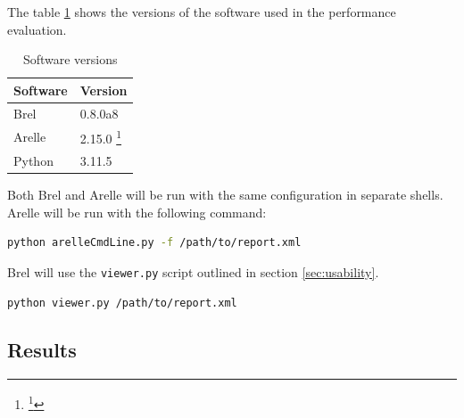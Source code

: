 
The table \ref{tab:software-versions} shows the versions of the software used in the performance evaluation.

\begin{table}[H]
    \centering
    \begin{tabular}{|l|l|}
        \hline
        \textbf{Software} & \textbf{Version} \\
        \hline
        Brel & 0.8.0a8 \\
        Arelle & 2.15.0 \footnote{\footnote{\url{https://github.com/Arelle/Arelle/releases/tag/2.15.0}}} \\
        Python & 3.11.5 \\
        \hline
    \end{tabular}
    \caption{Software versions}
    \label{tab:software-versions}
\end{table}

Both Brel and Arelle will be run with the same configuration in separate shells.
Arelle will be run with the following command:

\begin{lstlisting}[language=bash, basicstyle=\ttfamily\small]
python arelleCmdLine.py -f /path/to/report.xml
\end{lstlisting}

Brel will use the \texttt{viewer.py} script outlined in section \ref{sec:usability}.

\begin{lstlisting}[language=bash, basicstyle=\ttfamily\small]
python viewer.py /path/to/report.xml
\end{lstlisting}

\subsection{Results}

